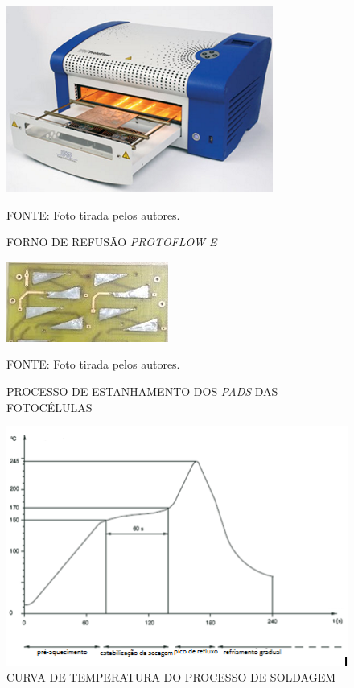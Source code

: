 \documentclass[
	12pt,				%
	openright,			%
	oneside,			%
	a4paper,			%
	english,			%
	french,				%
	spanish,			%
	brazil,				%
	oldfontcommands
	]{abntex2}
\begin{document}
\begin{apendicesenv}
	\begin{figure}[th]
		\caption{FORNO DE REFUSÃO \textit{PROTOFLOW E}}
		\centering
		\includegraphics[width=0.75\linewidth]{./anexos/proto1}
		
		\begin{small}
			FONTE: Foto tirada pelos autores.
		\end{small}	
	\end{figure}
	
	\begin{figure}[th]
		\caption{PROCESSO DE ESTANHAMENTO DOS \textit{PADS} DAS FOTOCÉLULAS}
		\centering
		\includegraphics[width=0.75\linewidth]{./anexos/proto2}
		
		\begin{small}
			FONTE: Foto tirada pelos autores.
		\end{small}	
	\end{figure}
	
	\begin{figure}[th]
		\caption{CURVA DE TEMPERATURA DO PROCESSO DE SOLDAGEM}
		\centering
		\includegraphics[width=0.75\linewidth]{./anexos/configproto}
		

\end{figure}
\end{apendicesenv}
\end{document}

